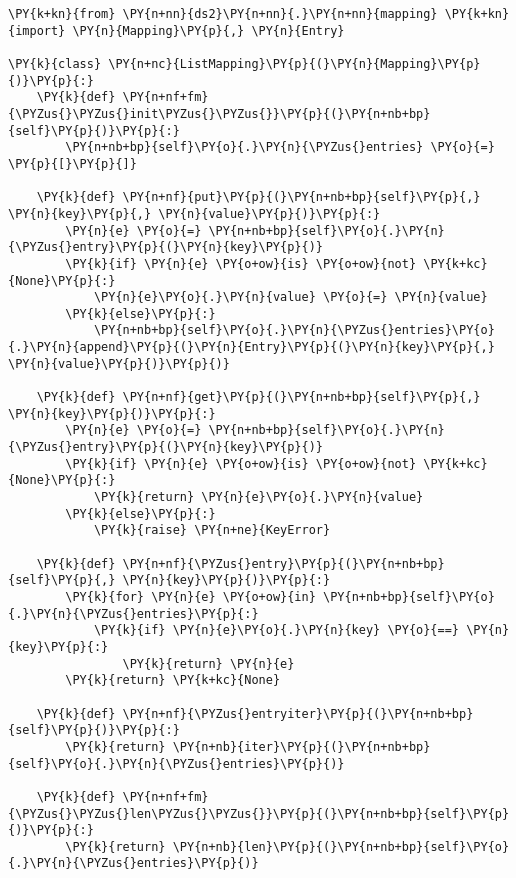 \begin{Verbatim}[commandchars=\\\{\}]
\PY{k+kn}{from} \PY{n+nn}{ds2}\PY{n+nn}{.}\PY{n+nn}{mapping} \PY{k+kn}{import} \PY{n}{Mapping}\PY{p}{,} \PY{n}{Entry}

\PY{k}{class} \PY{n+nc}{ListMapping}\PY{p}{(}\PY{n}{Mapping}\PY{p}{)}\PY{p}{:}
    \PY{k}{def} \PY{n+nf+fm}{\PYZus{}\PYZus{}init\PYZus{}\PYZus{}}\PY{p}{(}\PY{n+nb+bp}{self}\PY{p}{)}\PY{p}{:}
        \PY{n+nb+bp}{self}\PY{o}{.}\PY{n}{\PYZus{}entries} \PY{o}{=} \PY{p}{[}\PY{p}{]}

    \PY{k}{def} \PY{n+nf}{put}\PY{p}{(}\PY{n+nb+bp}{self}\PY{p}{,} \PY{n}{key}\PY{p}{,} \PY{n}{value}\PY{p}{)}\PY{p}{:}
        \PY{n}{e} \PY{o}{=} \PY{n+nb+bp}{self}\PY{o}{.}\PY{n}{\PYZus{}entry}\PY{p}{(}\PY{n}{key}\PY{p}{)}
        \PY{k}{if} \PY{n}{e} \PY{o+ow}{is} \PY{o+ow}{not} \PY{k+kc}{None}\PY{p}{:}
            \PY{n}{e}\PY{o}{.}\PY{n}{value} \PY{o}{=} \PY{n}{value}
        \PY{k}{else}\PY{p}{:}
            \PY{n+nb+bp}{self}\PY{o}{.}\PY{n}{\PYZus{}entries}\PY{o}{.}\PY{n}{append}\PY{p}{(}\PY{n}{Entry}\PY{p}{(}\PY{n}{key}\PY{p}{,} \PY{n}{value}\PY{p}{)}\PY{p}{)}

    \PY{k}{def} \PY{n+nf}{get}\PY{p}{(}\PY{n+nb+bp}{self}\PY{p}{,} \PY{n}{key}\PY{p}{)}\PY{p}{:}
        \PY{n}{e} \PY{o}{=} \PY{n+nb+bp}{self}\PY{o}{.}\PY{n}{\PYZus{}entry}\PY{p}{(}\PY{n}{key}\PY{p}{)}
        \PY{k}{if} \PY{n}{e} \PY{o+ow}{is} \PY{o+ow}{not} \PY{k+kc}{None}\PY{p}{:}
            \PY{k}{return} \PY{n}{e}\PY{o}{.}\PY{n}{value}
        \PY{k}{else}\PY{p}{:}
            \PY{k}{raise} \PY{n+ne}{KeyError}

    \PY{k}{def} \PY{n+nf}{\PYZus{}entry}\PY{p}{(}\PY{n+nb+bp}{self}\PY{p}{,} \PY{n}{key}\PY{p}{)}\PY{p}{:}
        \PY{k}{for} \PY{n}{e} \PY{o+ow}{in} \PY{n+nb+bp}{self}\PY{o}{.}\PY{n}{\PYZus{}entries}\PY{p}{:}
            \PY{k}{if} \PY{n}{e}\PY{o}{.}\PY{n}{key} \PY{o}{==} \PY{n}{key}\PY{p}{:}
                \PY{k}{return} \PY{n}{e}
        \PY{k}{return} \PY{k+kc}{None}

    \PY{k}{def} \PY{n+nf}{\PYZus{}entryiter}\PY{p}{(}\PY{n+nb+bp}{self}\PY{p}{)}\PY{p}{:}
        \PY{k}{return} \PY{n+nb}{iter}\PY{p}{(}\PY{n+nb+bp}{self}\PY{o}{.}\PY{n}{\PYZus{}entries}\PY{p}{)}

    \PY{k}{def} \PY{n+nf+fm}{\PYZus{}\PYZus{}len\PYZus{}\PYZus{}}\PY{p}{(}\PY{n+nb+bp}{self}\PY{p}{)}\PY{p}{:}
        \PY{k}{return} \PY{n+nb}{len}\PY{p}{(}\PY{n+nb+bp}{self}\PY{o}{.}\PY{n}{\PYZus{}entries}\PY{p}{)}
\end{Verbatim}




